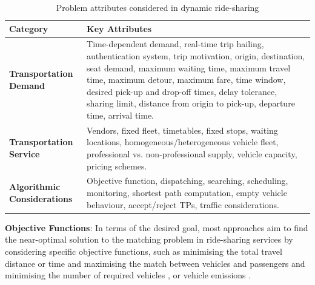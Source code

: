 \begin{table}[htbp]
\centering
\renewcommand{\arraystretch}{1.2} 
\setlength{\tabcolsep}{4pt} 
\small 
\begin{adjustbox}{max width=\textwidth}
\begin{tabular}{|p{3.5cm}|p{11cm}|}
\hline
\textbf{Category}            & \textbf{Key Attributes} \\ \hline

\multirow{1}{3.5cm}{\textbf{Transportation Demand}} 
& Time-dependent demand, real-time trip hailing, authentication system, trip motivation, origin, destination, seat demand, maximum waiting time, maximum travel time, maximum detour, maximum fare, time window, desired pick-up and drop-off times, delay tolerance, sharing limit, distance from origin to pick-up, departure time, arrival time. \\ \hline

\multirow{1}{3.5cm}{\textbf{Transportation Service}}
& Vendors, fixed fleet, timetables, fixed stops, waiting locations, homogeneous/heterogeneous vehicle fleet, professional vs. non-professional supply, vehicle capacity, pricing schemes. \\ \hline

\multirow{1}{3.5cm}{\textbf{Algorithmic Considerations}} 
& Objective function, dispatching, searching, scheduling, monitoring, shortest path computation, empty vehicle behaviour, accept/reject TPs, traffic considerations. \\ \hline

\end{tabular}
\end{adjustbox}
\caption{Problem attributes considered in dynamic ride-sharing}
\label{table:problem_inputs}
\end{table}

\textbf{Objective Functions}: In terms of the desired goal, most approaches aim to find the near-optimal solution to the matching problem in ride-sharing services by considering specific objective functions, such as minimising the total travel distance or time \cite{ota2017stars135, qian2017optimal143, dorey2014ridesharing53} and maximising the match between vehicles and passengers \cite{stiglic2016making162, ma2013tshare118, goel2017optimal68, herbawi2012ridematching80, berbeglia2012hybrid28, stiglic2015benefits161, santos2015taxi152} and minimising the number of required vehicles \cite{kirchler2013granular96, lehuede2014multicriteria107}, or vehicle emissions \cite{atahran2014multicriteria22}. 

